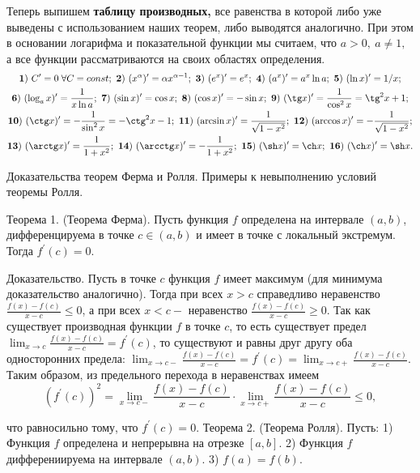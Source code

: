 Теперь выпишем \textbf{таблицу производных,}
все равенства в которой либо уже выведены
с использованием наших теорем, либо
выводятся аналогично. При этом в основании
логарифма и показательной функции мы считаем,
что $a>0, \ a\neq1,$ а все функции рассматриваются
на своих областях определения.
\begin{multline*}
{\bf 1)} \ C'=0\;\forall C=const; \ {\bf 2)} \ (x^{\alpha})'=
\alpha x^{\alpha-1}; \ {\bf 3)} \ (e^x)'=e^x; \ {\bf 4)} \ (a^x)'=
a^x\ln a; \ {\bf 5)} \ (\ln x)'=1/x;\\
{\bf 6)} \ (\log_a x)'=
\frac{1}{x\ln a}; \ {\bf 7)} \ (\sin x)'=\cos x; \
{\bf 8)} \ (\cos x)'=-\sin x; \ {\bf 9)} \ (\tg x)'=
\frac{1}{\cos^2x}=\tg^2x+1;\\
{\bf 10)} \ (\ctg x)'=-\frac{1}{\sin^2x}=-\ctg^2x-1; \
{\bf 11)} \ (\arcsin x)'=\frac{1}{\sqrt{1-x^2}}; \
{\bf 12)} \ (\arccos x)'=-\frac{1}{\sqrt{1-x^2}};\\
{\bf 13)} \ (\arctg x)'=\frac{1}{1+x^2}; \
{\bf 14)} \ (\arcctg x)'=-\frac{1}{1+x^2}; \
{\bf 15)} \ (\sh x)'=\ch x; \
{\bf 16)} \ (\ch x)'=\sh x.
\end{multline*}
\newpage

\begin{problem}
Доказательства теорем Ферма и Ролля. Примеры к невыполнению условий теоремы
Ролля.
\end{problem}
Теорема 1. (Теорема Ферма). Пусть функция $f$ определена на интервале $(a, b)$, дифференцируема в точке $c \in(a, b)$ и имеет в точке с локальный экстремум. Тогда $f^{\prime}(c)=0$.

Доказательство. Пусть в точке $c$ функция $f$ имеет максимум (для минимума доказательство аналогично). Тогда при всех $x>c$ справедливо неравенство $\frac{f(x)-f(c)}{x-c} \leq 0$, а при всех $x<c-$ неравенство $\frac{f(x)-f(c)}{x-c} \geq 0$. Так как существует производная функции $f$ в точке $c$, то есть существует предел $\lim _{x \rightarrow c} \frac{f(x)-f(c)}{x-c}=f^{\prime}(c)$, то существуют и равны друг другу оба односторонних предела: $\lim _{x \rightarrow c-} \frac{f(x)-f(c)}{x-c}=f^{\prime}(c)=\lim _{x \rightarrow c+} \frac{f(x)-f(c)}{x-c}$. Таким образом, из предельного перехода в неравенствах имеем
$$
\left(f^{\prime}(c)\right)^2=\lim _{x \rightarrow c-} \frac{f(x)-f(c)}{x-c} \cdot \lim _{x \rightarrow c+} \frac{f(x)-f(c)}{x-c} \leq 0,
$$

что равносильно тому, что $f^{\prime}(c)=0$.
Теорема 2. (Теорема Ролля). Пусть:
1) Функция $f$ определена и непрерывна на отрезке $[a, b]$.
2) Функция $f$ дифферениируема на интервале $(a, b)$.
3) $f(a)=f(b)$.

